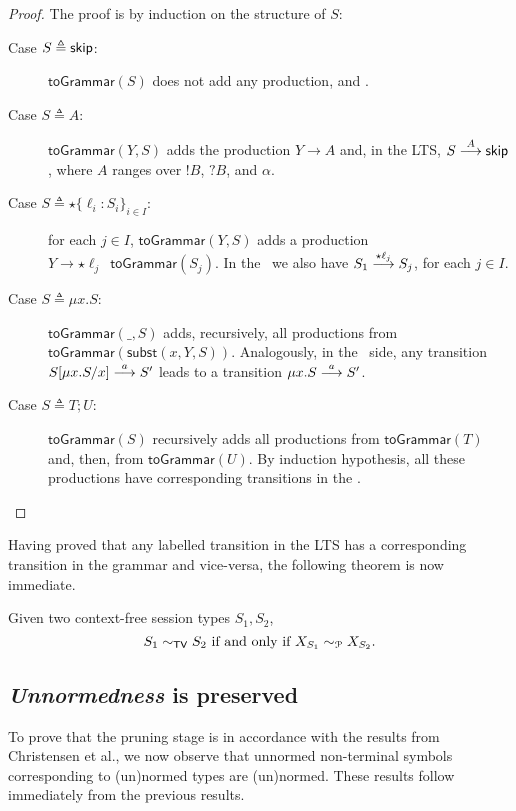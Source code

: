 \begin{proof}
	The proof is by induction on the structure of $S$:
	\begin{description}
		\item[Case $S \triangleq \skipk$:] $\mathsf{toGrammar}(S)$ does not 
		     add any production, and .
		\item[Case $S \triangleq A$:] $\mathsf{toGrammar}(Y,S)$ adds the 
		     production $Y\rightarrow A$ and, in the LTS, $S \LTSderives[A] 
		     \skipk$, where $A$ ranges over $!B$, $?B$, and $\alpha$.
		\item[Case $S\triangleq \star \{\ell_i : S_i\}_{i\in I}$:] for each 
		     $j\in I$, $\mathsf{toGrammar}(Y,S)$ adds a production 
		     \linebreak $Y \rightarrow \star \ell_j \enspace 
		     \mathsf{toGrammar}(S_j)$. In the \LTS\ we also have 
		     $S_1 \LTSderives[\star \ell_j] S_j$, for each $j\in I$.
		\item[Case $S\triangleq \mu x.S$:] $\mathsf{toGrammar}(\_,S)$ adds, 
		     recursively, all productions from \linebreak$\mathsf{toGrammar}
		     (\mathsf{subst}(x,Y,S))$. Analogously, in the \LTS\ side, any transition 
		     $S[\mu x.S/x] \LTSderives[a] S'$ leads to a transition 
		     $\mu x.S \LTSderives[a] S'$.
		\item[Case $S \triangleq T;U$:] $\mathsf{toGrammar}(S)$ recursively adds 
		     all productions from  $\mathsf{toGrammar}(T)$ and, then, from $\mathsf{toGrammar}(U)$.
		     By induction hypothesis, all these productions have corresponding 
		     transitions in the \LTS.
	\end{description}
\end{proof}

Having proved that any labelled transition in the LTS has a corresponding
transition in the grammar and vice-versa, the following theorem is now 
immediate.

\begin{theorem}
\label{cfst_vs_grammar}
	Given two context-free session types $S_1, S_2$,
	\[ S_1 \TypeEquiv S_2 \text{ if and only if } X_{S_1} \ProdEquiv X_{S_2}. \]
\end{theorem}

\subsection{\textit{Unnormedness} is preserved}

To prove that the pruning stage is in accordance with the results 
from Christensen et al., we now observe that unnormed non-terminal symbols 
corresponding to (un)normed types are (un)normed. These results follow 
immediately from the previous results. 

